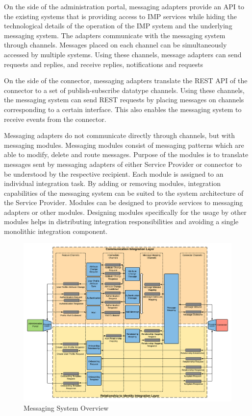 On the side of the administration portal, messaging adapters provide an API to the existing systems that is providing access to IMP services while hiding the technological details of the operation of the IMP system and the underlying messaging system. The adapters communicate with the messaging system through channels. Messages placed on each channel can be simultaneously accessed by multiple systems. Using these channels, message adapters can send requests and replies, and receive replies, notifications and requests

On the side of the connector, messaging adapters translate the REST API of the connector to a set of publish-subscribe datatype channels. Using these channels, the messaging system can send REST requests by placing messages on channels corresponding to a certain interface. This also enables the messaging system to receive events from the connector.

Messaging adapters do not communicate directly through channels, but with messaging modules. Messaging modules consist of messaging patterns which are able to modify, delete and route messages. Purpose of the modules is to translate messages sent by messaging adapters of either Service Provider or connector to be understood by the respective recipient. Each module is assigned to an individual integration task. By adding or removing modules, integration capabilities of the messaging system can be suited to the system architecture of the Service Provider. Modules can be designed to provide services to messaging adapters or other modules. Designing modules specifically for the usage by other modules helps in distributing integration responsibilities and avoiding a single monolithic integration component.

\begin{figure}[h]
    \centering
    \includegraphics[scale=0.45]{Diagrams/Integration Architecture 1/Technological Integration/4. Messaging Overview.pdf}
    \caption{Messaging System Overview}
    \label{integration1:messaging_system_overview}
\end{figure}

